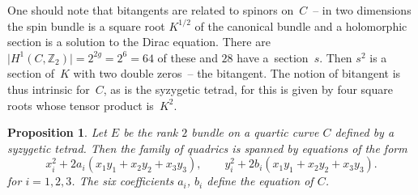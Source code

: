 \documentclass[pdftex]{sigma}
\numberwithin{equation}{section}
\newtheorem{Proposition}[Theorem]{Proposition}
 { \theoremstyle{definition}
\newtheorem{Remark}[Theorem]{Remark} }
\begin{document}
 One should note that bitangents are related to spinors on~$C$~-- in two dimensions the spin bundle is a square root $K^{1/2}$ of the canonical bundle and a holomorphic section is a solution to the Dirac equation. There are $\big\vert H^1(C,{\mathbb Z}_2)\big\vert=2^{2g}=2^6=64$ of these and $28$ have a~section~$s$. Then $s^2$ is a section of~$K$ with two double zeros~-- the bitangent. The notion of bitangent is thus intrinsic for~$C$, as is the syzygetic tetrad, for this is given by four square roots whose tensor product is~$K^2$.

 \begin{Proposition}
Let $E$ be the rank $2$ bundle on a quartic curve $C$ defined by a syzygetic tetrad. Then the family of quadrics is spanned by equations of the form
\[
x_i^2+2a_i(x_1y_1+x_2y_2+x_3y_3), \qquad y_i^2+2b_i(x_1y_1+x_2y_2+x_3y_3).
\]
for $i=1,2,3$. The six coefficients $a_i$, $b_i$ define the equation of $C$.
\end{Proposition}
\end{document}
